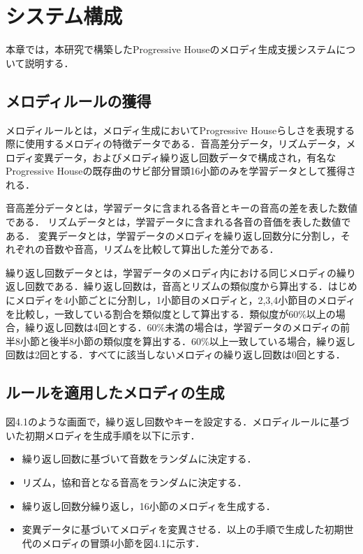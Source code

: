 \chapter{システム構成}
本章では，本研究で構築したProgressive Houseのメロディ生成支援システムについて説明する．

\section{メロディルールの獲得}
メロディルールとは，メロディ生成においてProgressive Houseらしさを表現する際に使用するメロディの特徴データである．音高差分データ，リズムデータ，メロディ変異データ，およびメロディ繰り返し回数データで構成され，有名なProgressive Houseの既存曲のサビ部分冒頭16小節のみを学習データとして獲得される．

音高差分データとは，学習データに含まれる各音とキーの音高の差を表した数値である．
リズムデータとは，学習データに含まれる各音の音価を表した数値である．
変異データとは，学習データのメロディを繰り返し回数分に分割し，それぞれの音数や音高，リズムを比較して算出した差分である．

繰り返し回数データとは，学習データのメロディ内における同じメロディの繰り返し回数である．繰り返し回数は，音高とリズムの類似度から算出する．はじめにメロディを4小節ごとに分割し，1小節目のメロディと，2,3,4小節目のメロディを比較し，一致している割合を類似度として算出する．類似度が60\%以上の場合，繰り返し回数は4回とする．60\%未満の場合は，学習データのメロディの前半8小節と後半8小節の類似度を算出する．60\%以上一致している場合，繰り返し回数は2回とする．すべてに該当しないメロディの繰り返し回数は0回とする．

\section{ルールを適用したメロディの生成}
図4.1のような画面で，繰り返し回数やキーを設定する．メロディルールに基づいた初期メロディを生成手順を以下に示す．
\begin{itemize}
  \item 繰り返し回数に基づいて音数をランダムに決定する．
  \item リズム，協和音となる音高をランダムに決定する．
  \item 繰り返し回数分繰り返し，16小節のメロディを生成する．
  \item 変異データに基づいてメロディを変異させる．以上の手順で生成した初期世代のメロディの冒頭4小節を図4.1に示す．
\end{itemize}


